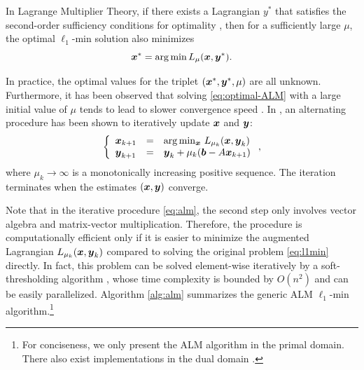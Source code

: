 \documentclass[10pt,twocolumn,letterpaper]{article}
\begin{document}
In Lagrange Multiplier Theory, if there exists a Lagrangian $y^*$ that
satisfies the second-order sufficiency conditions for optimality
\cite{BertsekasD2003}, then for a sufficiently large $\mu$, the optimal
$\ell_1$-min solution also minimizes
\begin{equation}
{\boldsymbol{x}}^* = \arg \min L_\mu({\boldsymbol{x}},{\boldsymbol{y}}^*).
\label{eq:optimal-ALM}
\end{equation}

In practice, the optimal values for the triplet $({\boldsymbol{x}}^*, {\boldsymbol{y}}^*, \mu)$ are all
unknown. Furthermore, it has been observed that solving
\eqref{eq:optimal-ALM} with a large initial value of $\mu$ tends to lead to
slower convergence speed \cite{WrightS2008,YangA2010-ICIP}. In
\cite{BertsekasD2003,YangJ2009}, an alternating procedure has been shown to
iteratively update ${\boldsymbol{x}}$ and ${\boldsymbol{y}}$:
\begin{equation}
\left \{
\begin{array}{lll}
{\boldsymbol{x}}_{k+1} & = & \arg\min_{{\boldsymbol{x}}} \, L_{\mu_k} ({\boldsymbol{x}},{\boldsymbol{y}}_k)\\
{\boldsymbol{y}}_{k+1} & = & {\boldsymbol{y}}_k + \mu_k ({\boldsymbol{b}} - A{\boldsymbol{x}}_{k+1}) \\
\end{array}
\right . ,
\label{eq:alm}
\end{equation}
where $\mu_{k}\rightarrow \infty$ is a monotonically increasing positive sequence.
The iteration terminates when the estimates $({\boldsymbol{x}}, {\boldsymbol{y}})$ converge.

Note that in the iterative procedure \eqref{eq:alm}, the second
step only involves vector algebra and matrix-vector multiplication. Therefore,
the procedure is computationally efficient only if it is easier to minimize the
augmented Lagrangian $L_{\mu_k} ({\boldsymbol{x}},{\boldsymbol{y}}_k)$ compared to solving the original problem
\eqref{eq:l1min} directly. In fact, this problem can be solved element-wise
iteratively by a soft-thresholding algorithm \cite{WrightS2008,BeckA2009},
whose time complexity is bounded by $O(n^2)$ and can be easily parallelized.
Algorithm \ref{alg:alm} summarizes the generic ALM $\ell_1$-min algorithm.\footnote{For conciseness, we
only present the ALM algorithm in the primal domain. There also
exist implementations in the dual domain \cite{YangJ2009,YangA2010-ICIP}.}
\end{document}
